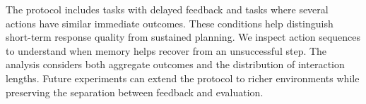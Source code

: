 The protocol includes tasks with delayed feedback and tasks where several
actions have similar immediate outcomes. These conditions help distinguish
short-term response quality from sustained planning. We inspect action
sequences to understand when memory helps recover from an unsuccessful step.
The analysis considers both aggregate outcomes and the distribution of
interaction lengths. Future experiments can extend the protocol to richer
environments while preserving the separation between feedback and evaluation.
